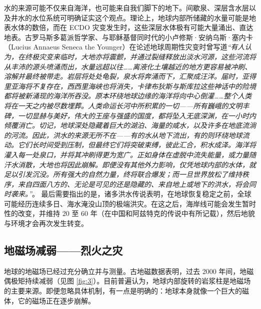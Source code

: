 \documentclass[10pt,twocolumn,letterpaper]{article}
\begin{document}
水的来源可能不仅来自海洋，也可能来自我们脚下的地下。间歇泉、深层含水层以及井水的水位系统可明确证实这个观点。理论上，地球内部所储藏的水量可能是地表水体的数倍\cite{4}，而在 ECDO 灾变发生时，这些深层水体极有可能大量涌出、直达地表。古罗马斯多葛派哲学家、与耶稣基督\cite{7}同时代的小卢修斯·安纳乌斯·塞内卡（Lucius Annaeus Seneca the Younger）在论述地球周期性灾变时曾写道\textit{“有人认为，在终极灾变来临时，大地亦将震颤，并通过裂缝释放出淡水河源，这些河流将从丰沛的源头喷涌而出，水量远超以往……离液化土壤越近的地方更容易被冲刷、溶解并最终被带走。岩层将处处龟裂，泉水将奔涌而下，汇聚成汪洋。届时，亚得里亚海将不复存在，西西里海峡也将消失，卡律布狄斯与斯库拉这些神话中的险境都将被新涌现的海洋所吞没。原本环绕地球边缘的海洋将向中心倒灌……整个人类将在一天之内被尽数埋葬。人类命运长河中所积累的一切——所有巍峨的文明丰碑，一切显赫与美好，伟大的王座与强盛的国度，都将坠入无底深渊，在一小时内倾覆消亡。切记，地球深处隐藏着巨大的湖泊、海量的咸水，以及许多在地底流淌的河流。因此，洪水的来源无所不在——有的水从地下流出，有的则环绕地球流动。它们长时间受到压制，但最终它们将突破束缚，彼此汇合，积水成泽。海洋将灌入每一处泉口，并将其冲刷得更为宽广。正如身体在虚脱中流失能量，或力量随汗水消散，大地也将因此崩解。即便没有其他外力影响，仅凭地球内部的水体，就足以引发沉没。所有强大的自然力量，终将联合爆发；而一旦世界放松了维持秩序，来自四面八方的、无论是可见的还是隐藏的、来自地上或地下的洪水，将会同时袭来。”}。 \cite{8}
最后需要指出的是，诸多洪水传说表明，在地球恢复稳定之前，全球可能经历连续多日、海水淹没山顶的极端洪灾。在这之后，海岸线可能会发生暂时性的改变，并维持 20 至 60 年（在中国和阿兹特克的传说中有所记载）\cite{5,6}，然后地貌与环境才会再次发生转变。

\subsection{地磁场减弱——烈火之灾}
地球的地磁场已经过充分确立并与测量。古地磁数据表明，过去 2000 年间，地磁偶极矩持续减弱\cite{9}（见图 \ref{fig:3}）。目前普遍认为，地球内部旋转的岩浆柱是地磁场的主要来源。即便忽略具体机制，有一点是明确的：地球本身就像一个巨大的磁体，它的磁场正在逐步崩解。
\end{document}
